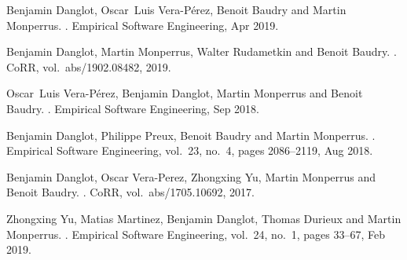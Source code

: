 \renewcommand\bibname{~}
\vspace{-2.8cm}
\let\oldaddcontentsline\addcontentsline%
\renewcommand{\addcontentsline}[3]{}%
\begingroup
\let\clearpage\relax
\begin{thebibliography}{xxxx}
	Benjamin Danglot, Oscar~Luis Vera-P{\'e}rez, Benoit Baudry and Martin
	Monperrus.
	.
	\newblock Empirical Software Engineering, Apr 2019.
	
	Benjamin Danglot, Martin Monperrus, Walter Rudametkin and Benoit Baudry.
	.
	\newblock CoRR, vol.~abs/1902.08482, 2019.
	
	Oscar~Luis Vera-P{\'e}rez, Benjamin Danglot, Martin Monperrus and Benoit
	Baudry.
	.
	\newblock Empirical Software Engineering, Sep 2018.
	
	Benjamin Danglot, Philippe Preux, Benoit Baudry and Martin Monperrus.
	.
	\newblock Empirical Software Engineering, vol.~23, no.~4, pages 2086--2119, Aug
	2018.
	
	Benjamin Danglot, Oscar Vera{-}Perez, Zhongxing Yu, Martin Monperrus and Benoit
	Baudry.
	.
	\newblock CoRR, vol.~abs/1705.10692, 2017.
	
	Zhongxing Yu, Matias Martinez, Benjamin Danglot, Thomas Durieux and Martin
	Monperrus.
	.
	\newblock Empirical Software Engineering, vol.~24, no.~1, pages 33--67, Feb
	2019.
\end{thebibliography}
\endgroup
\let\addcontentsline\oldaddcontentsline%

